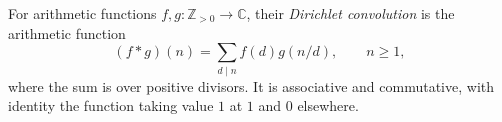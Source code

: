 
For arithmetic functions $f,g:\mathbb Z_{>0}\to\mathbb C$, their \emph{Dirichlet convolution} is the arithmetic function
\[
(f*g)(n)=\sum_{d\mid n}f(d)g(n/d),\qquad n\ge1,
\]
where the sum is over positive divisors. It is associative and commutative, with identity the function taking value $1$ at $1$ and $0$ elsewhere.

